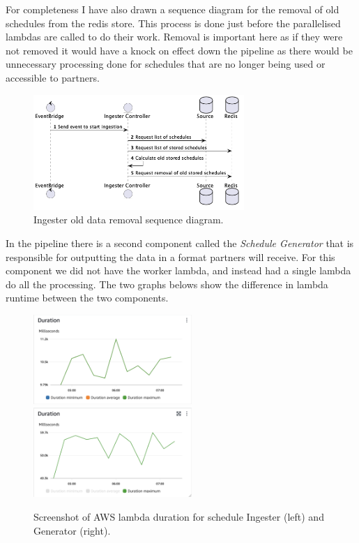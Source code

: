   For completeness I have also drawn a sequence diagram for the removal of old schedules from the redis store. This process is done just before the 
  parallelised lambdas are called to do their work. Removal is important here as if they were not removed it would have a knock on effect down the pipeline 
  as there would be unnecessary processing done for schedules that are no longer being used or accessible to partners.

  \begin{figure}[H]
    \centering
    \includegraphics[width=8cm]{assets/diagrams/ingesterDataRemoval.png}
    \caption{Ingester old data removal sequence diagram.}
    \label{fig:ingesterScheduleRemoval}
  \end{figure}

  In the pipeline there is a second component called the \textit{Schedule Generator} that is responsible for outputting the data in a format partners will
  receive. For this component we did not have the worker lambda, and instead had a single lambda do all the processing. The two graphs belows show the 
  difference in lambda runtime between the two components.

  \begin{figure}[H]
    \centering
    \includegraphics[width=6cm]{assets/ingesterDuration.png}
    \includegraphics[width=6cm]{assets/generatorDuration.png}
    \caption{Screenshot of AWS lambda duration for schedule Ingester (left) and Generator (right).}
    \label{fig:lambdaDurationDifference}
  \end{figure}

